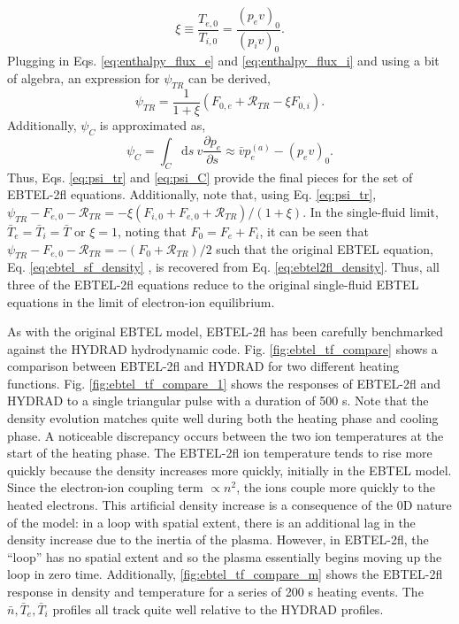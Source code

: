 %
\begin{equation}
	\xi\equiv\frac{T_{e,0}}{T_{i,0}}=\frac{(p_ev)_0}{(p_iv)_0}.
\end{equation}
Plugging in Eqs. \ref{eq:enthalpy_flux_e} and \ref{eq:enthalpy_flux_i} and using a bit of algebra, an expression for $\psi_{TR}$ can be derived,
\begin{equation}
	\label{eq:psi_tr}
	\psi_{TR} = \frac{1}{1 + \xi}(F_{0,e} + \mathcal{R}_{TR} - \xi F_{0,i}).
\end{equation}
Additionally, $\psi_C$ is approximated as,
\begin{equation}
	\label{eq:psi_C}
	\psi_C = \int_C\mathrm{d}s~v\frac{\partial p_e}{\partial s}\approx \bar{v}p_e^{(a)} - (p_ev)_0.
\end{equation}
Thus, Eqs. \ref{eq:psi_tr} and \ref{eq:psi_C} provide the final pieces for the set of EBTEL-2fl equations. Additionally, note that, using Eq. \ref{eq:psi_tr}, $\psi_{TR} - F_{e,0} - \mathcal{R}_{TR}=-\xi(F_{i,0} + F_{e,0} + \mathcal{R}_{TR})/(1 + \xi)$. In the single-fluid limit, $\bar{T}_e=\bar{T}_i=\bar{T}$ or $\xi=1$, noting that $F_0=F_e + F_i$, it can be seen that $\psi_{TR} - F_{e,0} - \mathcal{R}_{TR}=-(F_0 + \mathcal{R}_{TR})/2$ such that the original EBTEL equation, Eq. \ref{eq:ebtel_sf_density} , is recovered from Eq. \ref{eq:ebtel2fl_density}. Thus, all three of the EBTEL-2fl equations reduce to the original single-fluid EBTEL equations in the limit of electron-ion equilibrium.
%
\par As with the original EBTEL model, EBTEL-2fl has been carefully benchmarked against the HYDRAD hydrodynamic code. Fig. \ref{fig:ebtel_tf_compare} shows a comparison between EBTEL-2fl and HYDRAD for two different heating functions. Fig. \ref{fig:ebtel_tf_compare_1} shows the responses of EBTEL-2fl and HYDRAD to a single triangular pulse with a duration of 500 s. Note that the density evolution matches quite well during both the heating phase and cooling phase. A noticeable discrepancy occurs between the two ion temperatures at the start of the heating phase. The EBTEL-2fl ion temperature tends to rise more quickly because the density increases more quickly, initially in the EBTEL model. Since the electron-ion coupling term $\propto n^2$, the ions couple more quickly to the heated electrons. This artificial density increase is a consequence of the 0D nature of the model: in a loop with spatial extent, there is an additional lag in the density increase due to the inertia of the plasma. However, in EBTEL-2fl, the ``loop'' has no spatial extent and so the plasma essentially begins moving up the loop in zero time. Additionally, \ref{fig:ebtel_tf_compare_m} shows the EBTEL-2fl response in density and temperature for a series of 200 s heating events. The $\bar{n},\bar{T}_e,\bar{T}_i$ profiles all track quite well relative to the HYDRAD profiles.
%
